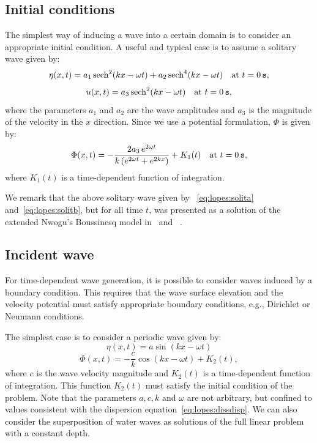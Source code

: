 \subsection{Initial conditions}
The simplest way of inducing a wave into a certain domain is
to consider an appropriate initial condition. A useful and
typical case is to assume a solitary wave given by:
\begin{equation}\label{eq:lopes:solita}
\eta(x,t)=a_1\,{\rm sech}^2(kx -\omega t)+a_2\,{\rm
  sech}^4(kx-\omega t)\quad {\rm at\,\,} t=0\,{\tt s},
\end{equation}
\begin{equation}\label{eq:lopes:solitb}
u(x,t)=a_3\,{\rm sech}^2(k x-\omega t) \quad {\rm at\,\,}
t=0\,{\tt s},
\end{equation}
where the parameters $a_1$ and $a_2$ are the wave amplitudes
and $a_3$ is the magnitude of the velocity in the $x$
direction.  Since we use a potential formulation, $\Phi$ is
given by:
\begin{equation}\label{eq:lopes:solitp}
\Phi(x,t)=-\frac{2a_3\,e^{2\omega t }}{k\,(e^{2\omega t
  }+e^{2k x})}+ K_1(t) \quad {\rm at\,\,} t=0\,{\tt s},
\end{equation}
where $K_1(t)$ is a time-dependent function of integration.

We remark that the above solitary wave given by
~\eqref{eq:lopes:solita} and~\eqref{eq:lopes:solitb}, but
for all time $t$, was presented as a solution of the
extended Nwogu's Boussinesq model in~\cite{Walkley1999}
and~\cite{WeiKirby1995} .

\subsection{Incident wave}
For time-dependent wave generation, it is possible to
consider waves induced by a boundary condition.  This
requires that the wave surface elevation and the velocity
potential must satisfy appropriate boundary conditions,
e.g., Dirichlet or Neumann conditions.

The simplest case is to consider a periodic wave given by:
\begin{equation}\label{eq:lopes:dirichleteta}
\eta(x,t)=a \sin(kx-\omega t)
\end{equation}
\begin{equation}\label{eq:lopes:dirichletphi}
\Phi(x,t)=-\frac{c}{k}\cos(k x-\omega t)+K_2(t),
\end{equation}
where $c$ is the wave velocity magnitude and $K_2(t)$ is a
time-dependent function of integration.  This function
$K_2(t)$ must satisfy the initial condition of the problem.
Note that the parameters $a,c,k$ and $\omega$ are not
arbitrary, but confined to values consistent with the
dispersion equation~\eqref{eq:lopes:dissdisp}.  We can also
consider the superposition of water waves as solutions of
the full linear problem with a constant depth.


